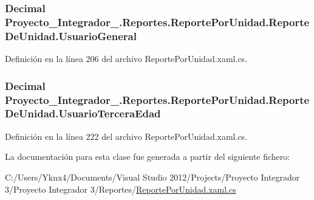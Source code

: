 \hypertarget{class_proyecto___integrador__3_1_1_reportes_1_1_reporte_por_unidad_1_1_reporte_de_unidad_a4f6bbb5f64597b687fc92b97b6080b7a}{
\subsubsection[{Usuario\-General}]{\setlength{\rightskip}{0pt plus 5cm}Decimal Proyecto\-\_\-\-Integrador\-\_.\-Reportes.\-Reporte\-Por\-Unidad.\-Reporte\-De\-Unidad.\-Usuario\-General\hspace{0.3cm}{\ttfamily [get]}}}\label{class_proyecto___integrador__3_1_1_reportes_1_1_reporte_por_unidad_1_1_reporte_de_unidad_a4f6bbb5f64597b687fc92b97b6080b7a}


Definición en la línea 206 del archivo Reporte\-Por\-Unidad.\-xaml.\-cs.

\hypertarget{class_proyecto___integrador__3_1_1_reportes_1_1_reporte_por_unidad_1_1_reporte_de_unidad_a059c79268e28b401f6792a4990807e25}{
\subsubsection[{Usuario\-Tercera\-Edad}]{\setlength{\rightskip}{0pt plus 5cm}Decimal Proyecto\-\_\-\-Integrador\-\_.\-Reportes.\-Reporte\-Por\-Unidad.\-Reporte\-De\-Unidad.\-Usuario\-Tercera\-Edad\hspace{0.3cm}{\ttfamily [get]}}}\label{class_proyecto___integrador__3_1_1_reportes_1_1_reporte_por_unidad_1_1_reporte_de_unidad_a059c79268e28b401f6792a4990807e25}


Definición en la línea 222 del archivo Reporte\-Por\-Unidad.\-xaml.\-cs.



La documentación para esta clase fue generada a partir del siguiente fichero\-:\begin{DoxyCompactItemize}
\item 
C\-:/\-Users/\-Yknx4/\-Documents/\-Visual Studio 2012/\-Projects/\-Proyecto Integrador 3/\-Proyecto Integrador 3/\-Reportes/\hyperlink{_reporte_por_unidad_8xaml_8cs}{Reporte\-Por\-Unidad.\-xaml.\-cs}\end{DoxyCompactItemize}

